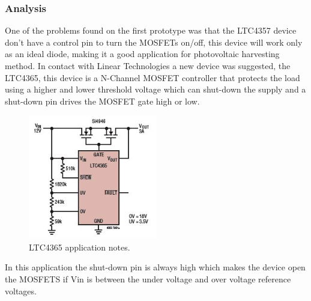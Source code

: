 \subsubsection{Analysis}

One of the problems found on the first prototype was that the LTC4357 device don't have a control pin to turn the MOSFETs on/off, this device will work only as an ideal diode, making it a good application for photovoltaic harvesting method.
In contact with Linear Technologies a new device was suggested, the LTC4365, this device is a N-Channel MOSFET controller that protects the load using a higher and lower threshold voltage which can shut-down the supply and a shut-down pin drives the MOSFET gate high or low.

\begin{figure}[H]
	\begin{centering}
		\includegraphics[width=0.5\textwidth]{images/ltc4365.png}
		\caption{LTC4365 application notes.}
	\end{centering}
\end{figure}
In this application the shut-down pin is always high which makes the device open the MOSFETS if Vin is between the under voltage and over voltage reference voltages.

